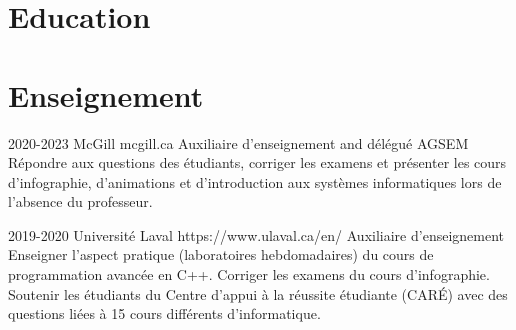 \documentclass[10pt]{article} %
\begin{document}

\section{Education}







\section{Enseignement}


\job
{}{2020-2023}
{McGill}
{mcgill.ca}
{Auxiliaire d'enseignement and délégué AGSEM}
{Répondre aux questions des étudiants, corriger les examens et présenter les cours d'infographie,
d'animations et d'introduction aux systèmes informatiques lors de l'absence du professeur.}

\job
{}{2019-2020}
{Université Laval}
{https://www.ulaval.ca/en/}
{Auxiliaire d'enseignement}
{Enseigner l'aspect pratique (laboratoires hebdomadaires) du cours de programmation avancée en C++. Corriger les examens du cours d'infographie. Soutenir les étudiants du Centre d'appui à la réussite étudiante (CARÉ) avec des questions liées à 15 cours différents d'informatique.}
\end{document}
